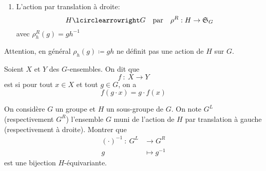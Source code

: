 \begin{example}
\begin{itemize}
\begin{enumerate}
            \item L'action par translation à droite:
            \begin{equation*}
                H \act G \quad\text{par}\quad \rho^R : H \to {\mathfrak{S}}_G
            \end{equation*}
            avec \(\rho^R_h(g) = gh^{-1}\)
        \end{enumerate}
    \end{itemize}
    \begin{remark}
        Attention, en général \(\rho_h(g)\coloneq gh\) ne définit pas une action de \(H\) sur \(G\).
    \end{remark}
\end{example}


\begin{definition}
    Soient \(X\) et \(Y\) des \(G\)-ensembles. On dit que
    \begin{equation*}
        f\ \colon\ X\to Y
    \end{equation*}
    est  si pour tout \(x\in X\) et tout \(g\in G\), on a
    \begin{equation*}
        f(g\cdot x) = g\cdot f(x)
    \end{equation*}
\end{definition}

\begin{exo}
    On considère \(G\) un groupe et \(H\) un sous-groupe de \(G\).
    On note \(G^L\) (respectivement \(G^R\)) l'ensemble \(G\) muni de l'action de \(H\)
    par translation à gauche (respectivement à droite). Montrer que
    \begin{equation*}
        \begin{aligned}
            {(\cdot)}^{-1}\ \colon\ G^L &\to G^R\\
            g &\mapsto g^{-1}
        \end{aligned}
    \end{equation*}
    est une bijection \(H\)-équivariante.
\end{exo}

